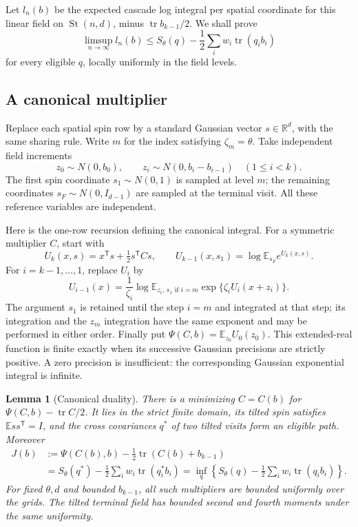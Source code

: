 \documentclass[11pt]{article}
\numberwithin{equation}{section}
\newtheorem{lemma}[theorem]{Lemma}
\theoremstyle{definition}
\newcommand{\E}{\mathbb E}
\newcommand{\R}{\mathbb R}
\newcommand{\tr}{\operatorname{tr}}
\newcommand{\St}{\operatorname{St}}
\begin{document}
Let $l_n(b)$ be the expected cascade log integral per spatial coordinate for this linear field on $\St(n,d)$, minus $\tr b_{k-1}/2$. We shall prove
\begin{equation}\label{eq:linearbound}
\limsup_{n\to\infty}l_n(b)\le
S_\theta(q)-\frac12\sum_iw_i\tr(q_i b_i)
\end{equation}
for every eligible $q$, locally uniformly in the field levels.

\subsection{A canonical multiplier}
Replace each spatial spin row by a standard Gaussian vector $s\in\R^d$, with the same sharing rule. Write $m$ for the index satisfying $\zeta_m=\theta$. Take independent field increments
\[
z_0\sim N(0,b_0),\qquad
z_i\sim N(0,b_i-b_{i-1})\quad(1\le i<k).
\]
The first spin coordinate $s_1\sim N(0,1)$ is sampled at level $m$; the remaining coordinates $s_F\sim N(0,I_{d-1})$ are sampled at the terminal visit. All these reference variables are independent.

Here is the one-row recursion defining the canonical integral. For a symmetric multiplier $C$, start with
\[
U_k(x,s)=x^{\mathsf T}s+\tfrac12s^{\mathsf T}Cs,
\qquad
U_{k-1}(x,s_1)=\log\E_{s_F}e^{U_k(x,s)}.
\]
For $i=k-1,\ldots,1$, replace $U_i$ by
\[
U_{i-1}(x)=\frac1{\zeta_i}\log
\E_{z_i,\,s_1\text{ if }i=m}
   \exp\{\zeta_i U_i(x+z_i)\}.
\]
The argument $s_1$ is retained until the step $i=m$ and integrated at that step; its integration and the $z_m$ integration have the same exponent and may be performed in either order. Finally put $\Psi(C,b)=\E_{z_0}U_0(z_0)$. This extended-real function is finite exactly when its successive Gaussian precisions are strictly positive. A zero precision is insufficient: the corresponding Gaussian exponential integral is infinite.

\begin{lemma}[Canonical duality]\label{lem:canonical}
There is a minimizing $C=C(b)$ for $\Psi(C,b)-\tr C/2$. It lies in the strict finite domain, its tilted spin satisfies $\E ss^{\mathsf T}=I$, and the cross covariances $q^*$ of two tilted visits form an eligible path. Moreover
\begin{equation}\label{eq:canonicalduality}
\begin{split}
J(b)&:=\Psi(C(b),b)-\tfrac12\tr(C(b)+b_{k-1})\\
&=S_\theta(q^*)-\frac12\sum_iw_i\tr(q_i^*b_i)
=\inf_q\left\{S_\theta(q)-\frac12\sum_iw_i\tr(q_i b_i)\right\}.
\end{split}
\end{equation}
For fixed $\theta,d$ and bounded $b_{k-1}$, all such multipliers are bounded uniformly over the grids. The tilted terminal field has bounded second and fourth moments under the same uniformity.
\end{lemma}
\end{document}
